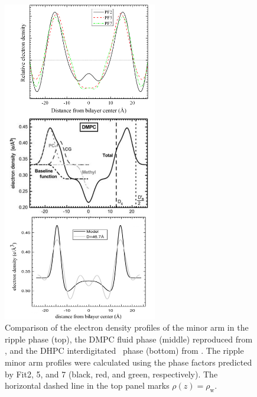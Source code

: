 \begin{figure}[htbp]
  \centering
  \includegraphics[width=0.6\textwidth]{figures/ripple/discussion/minor-arm_comparison}
  \caption[Comparison of the electron density profiles of 
  the minor arm in the ripple phase (top),  
  the DMPC fluid phase (middle) reproduced from \cite{Kucerka05_BPJ}, and
  the DHPC interdigitated \LI\ phase (bottom) from \cite{ref:Guler09}]
  {Comparison of the electron density profiles of 
  the minor arm in the ripple phase (top),  
  the DMPC fluid phase (middle) reproduced from \cite{Kucerka05_BPJ}, and
  the DHPC interdigitated \LI\ phase (bottom) from \cite{ref:Guler09}. 
  The ripple minor arm profiles were calculated 
  using the phase factors predicted by Fit2, 5, and 7 (black, red, and green, respectively). 
  The horizontal dashed line in the top panel marks $\rho(z)=\rho_\text{w}$.
  }
  \label{fig:minor_comparison}
\end{figure}

